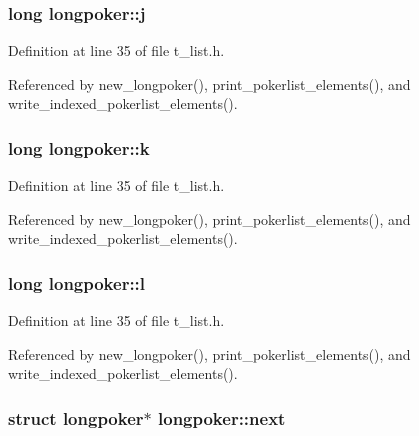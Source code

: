 \hypertarget{structlongpoker_a22a8f8c53ef43a705ad9c6fc8ae738ed}{
\subsubsection[{j}]{\setlength{\rightskip}{0pt plus 5cm}long longpoker\-::j}}\label{structlongpoker_a22a8f8c53ef43a705ad9c6fc8ae738ed}


Definition at line 35 of file t\-\_\-list.\-h.



Referenced by new\-\_\-longpoker(), print\-\_\-pokerlist\-\_\-elements(), and write\-\_\-indexed\-\_\-pokerlist\-\_\-elements().

\hypertarget{structlongpoker_a8208bf9986edd07dcb8334ebef57476c}{
\subsubsection[{k}]{\setlength{\rightskip}{0pt plus 5cm}long longpoker\-::k}}\label{structlongpoker_a8208bf9986edd07dcb8334ebef57476c}


Definition at line 35 of file t\-\_\-list.\-h.



Referenced by new\-\_\-longpoker(), print\-\_\-pokerlist\-\_\-elements(), and write\-\_\-indexed\-\_\-pokerlist\-\_\-elements().

\hypertarget{structlongpoker_a93823f89553e9099ead1f04466c47bdd}{
\subsubsection[{l}]{\setlength{\rightskip}{0pt plus 5cm}long longpoker\-::l}}\label{structlongpoker_a93823f89553e9099ead1f04466c47bdd}


Definition at line 35 of file t\-\_\-list.\-h.



Referenced by new\-\_\-longpoker(), print\-\_\-pokerlist\-\_\-elements(), and write\-\_\-indexed\-\_\-pokerlist\-\_\-elements().

\hypertarget{structlongpoker_ac0b1dc3839bc45cc411086348e86eb1e}{
\subsubsection[{next}]{\setlength{\rightskip}{0pt plus 5cm}struct {\bf longpoker}$\ast$ longpoker\-::next}}\label{structlongpoker_ac0b1dc3839bc45cc411086348e86eb1e}


